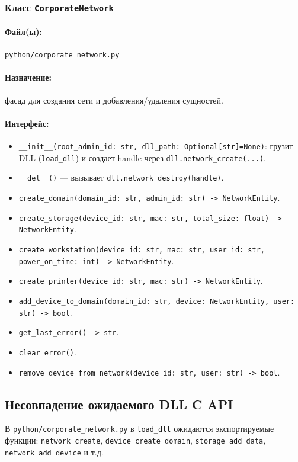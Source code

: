 \documentclass[14pt,a4paper]{extarticle}
\begin{document}
\subsubsection{Класс \texttt{CorporateNetwork}}
\paragraph{Файл(ы):} \texttt{python/corporate\_network.py}
\paragraph{Назначение:} фасад для создания сети и добавления/удаления сущностей.
\paragraph{Интерфейс:}
\begin{itemize}
  \item \texttt{\_\_init\_\_(root\_admin\_id: str, dll\_path: Optional[str]=None)}:
  грузит DLL (\texttt{load\_dll}) и создает handle через \texttt{dll.network\_create(...)}.
  \item \texttt{\_\_del\_\_()} --- вызывает \texttt{dll.network\_destroy(handle)}.
  \item \texttt{create\_domain(domain\_id: str, admin\_id: str) -> NetworkEntity}.
  \item \texttt{create\_storage(device\_id: str, mac: str, total\_size: float) -> NetworkEntity}.
  \item \texttt{create\_workstation(device\_id: str, mac: str, user\_id: str, power\_on\_time: int) -> NetworkEntity}.
  \item \texttt{create\_printer(device\_id: str, mac: str) -> NetworkEntity}.
  \item \texttt{add\_device\_to\_domain(domain\_id: str, device: NetworkEntity, user: str) -> bool}.
  \item \texttt{get\_last\_error() -> str}.
  \item \texttt{clear\_error()}.
  \item \texttt{remove\_device\_from\_network(device\_id: str, user: str) -> bool}.
\end{itemize}

\subsection{Несовпадение ожидаемого DLL C API}
В \texttt{python/corporate\_network.py} в \texttt{load\_dll} ожидаются экспортируемые функции:
\texttt{network\_create}, \texttt{device\_create\_domain}, \texttt{storage\_add\_data}, \texttt{network\_add\_device} и т.д.
\end{document}
